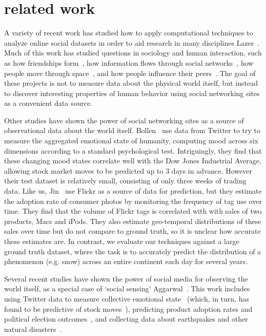 \section{related work}
\label{sec:relatedwork}

A variety of recent work has studied how to apply computational
techniques to analyze online social datasets in order to aid research
in many disciplines Lazer\etal~\cite{lazer09}. Much of this work has studied
questions in sociology and human interaction, such as how friendships
form~\cite{feedback08kdd}, how information flows through social
networks~\cite{libennowell08}, how people move through
space~\cite{brockmann06}, and how people influence their
peers~\cite{anagnostpopoulos08}.  The goal of these projects is not to
measure data about the physical world itself, but instead to discover
interesting properties of human behavior using social networking sites
as a convenient data source.

Other studies have shown the power of social networking sites as a
source of observational data about the world itself.  Bollen\etal~\cite{bollen11twitter} use data from Twitter to try to measure
the aggregated emotional state of humanity, computing mood across six
dimensions according to a standard psychological
test. Intriguingly, they find that these changing mood states
correlate well with the Dow Jones Industrial Average, allowing stock
market moves to be predicted up to 3 days in advance.  However their
test dataset is relatively small, consisting of only three weeks of
trading data.  Like us, Jin\etal~\cite{jin10prediction} use
Flickr as a source of data for prediction, but they estimate the
adoption rate of consumer photos by monitoring the frequency of tag
use over time. They find that the volume of Flickr tags is 
correlated  with with sales of two products, Macs and iPods. They also
estimate geo-temporal distributions of these sales over time but do
not compare to ground truth, so it is unclear how accurate these
estimates are. In contrast, we evaluate our techniques against a large
ground truth dataset, where the task is to accurately predict the
distribution of a phenomenon (e.g. snow) across an entire continent 
each day for several years.


Several recent studies have shown the power of social media  for observing
the world itself, as a special case of `social sensing' Aggarwal\etal~\cite{Aggarwal:2013vh}.
This work includes using Twitter data to measure collective emotional
state~\cite{Golder:2011cy} (which, in turn, has found to
be predictive of stock moves~\cite{bollen11twitter}),
predicting product adoption rates and political election
outcomes~\cite{jin10prediction}, and collecting data about
earthquakes and other natural disasters~\cite{Sakaki:2010uv}.

